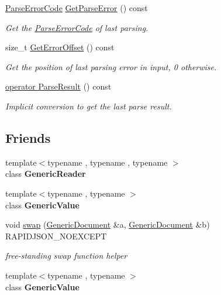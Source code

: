 \begin{Indent}
\begin{DoxyCompactItemize}
\hyperlink{group__RAPIDJSON__ERRORS_ga8d4b32dfc45840bca189ade2bbcb6ba7}{Parse\+Error\+Code} \hyperlink{classGenericDocument_a9400a5bd3169cc6ed545e681ccc06070}{Get\+Parse\+Error} () const
\begin{DoxyCompactList}\small\item\em Get the \hyperlink{group__RAPIDJSON__ERRORS_ga8d4b32dfc45840bca189ade2bbcb6ba7}{Parse\+Error\+Code} of last parsing. \end{DoxyCompactList}\item 
\mbox{\label{classGenericDocument_ae1ef7ca99ced428e9300c68e5142afdb}} 
size\+\_\+t \hyperlink{classGenericDocument_ae1ef7ca99ced428e9300c68e5142afdb}{Get\+Error\+Offset} () const
\begin{DoxyCompactList}\small\item\em Get the position of last parsing error in input, 0 otherwise. \end{DoxyCompactList}\item 
\hyperlink{classGenericDocument_af9bb8eade3eae0c039161378e8d2923a}{operator Parse\+Result} () const
\begin{DoxyCompactList}\small\item\em Implicit conversion to get the last parse result. \end{DoxyCompactList}\end{DoxyCompactItemize}
\end{Indent}
\subsection*{Friends}
\begin{DoxyCompactItemize}
\item 
\mbox{\label{classGenericDocument_a22b985b0f7f78ef254a566655ee0550f}} 
{\footnotesize template$<$typename , typename , typename $>$ }\\class {\bfseries Generic\+Reader}
\item 
\mbox{\label{classGenericDocument_a899449e1a645b5e377af059fb61113d8}} 
{\footnotesize template$<$typename , typename $>$ }\\class {\bfseries Generic\+Value}
\item 
void \hyperlink{classGenericDocument_a0d63efcc43758ac3aed77e868233369d}{swap} (\hyperlink{classGenericDocument}{Generic\+Document} \&a, \hyperlink{classGenericDocument}{Generic\+Document} \&b) R\+A\+P\+I\+D\+J\+S\+O\+N\+\_\+\+N\+O\+E\+X\+C\+E\+PT
\begin{DoxyCompactList}\small\item\em free-\/standing swap function helper \end{DoxyCompactList}\item 
\mbox{\label{classGenericDocument_ae85bda3be5ddb0ad7b3dc29984467ac2}} 
{\footnotesize template$<$typename , typename $>$ }\\class {\bfseries Generic\+Value}
\end{DoxyCompactItemize}
